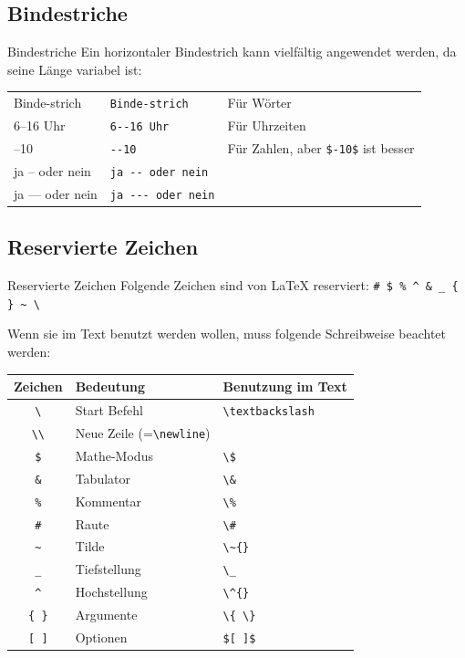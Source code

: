 \documentclass[xcolor=dvipsnames]{beamer}
\begin{document}
\subsection{Bindestriche}
\begin{frame}[fragile]{Bindestriche}
Ein horizontaler Bindestrich kann vielfältig angewendet werden, da seine Länge variabel ist: \par\medskip
{\footnotesize
\begin{tabular}{|l|l|l|}
\hline
Binde-strich & \verb|Binde-strich| & Für Wörter \\
6--16 Uhr & \verb|6--16 Uhr| & Für Uhrzeiten \\
--10 & \verb|--10| & Für Zahlen, aber \verb|$-10$| ist besser \\
ja -- oder nein & \verb|ja -- oder nein| & \\
ja --- oder nein & \verb|ja --- oder nein| & \\ \hline
\end{tabular}
}
\end{frame}


\subsection{Reservierte Zeichen} \label{sub:reserved}
\begin{frame}[fragile]{Reservierte Zeichen}
Folgende Zeichen sind von \LaTeX{} reserviert: \texttt{\# \$ \% \^{} \& \_ \{ \} \~{} \textbackslash{}} \par\medskip
Wenn sie im Text benutzt werden wollen, muss folgende Schreibweise beachtet werden: \par\medskip
{\footnotesize
\begin{tabular}{|c|l|l|}
\hline
Zeichen & Bedeutung & Benutzung im Text \\
\hline
\texttt{\textbackslash} & Start Befehl & \verb|\textbackslash| \\
\texttt{\textbackslash\textbackslash} & Neue Zeile (=\verb|\newline|) & \\
\texttt{\$} & Mathe-Modus & \verb|\$| \\
\texttt{\&} & Tabulator & \verb|\&| \\
\texttt{\%} & Kommentar & \verb|\%| \\
\texttt{\#} & Raute & \verb|\#| \\
\texttt{\~{}} & Tilde & \verb|\~{}| \\
\texttt{\_} & Tiefstellung & \verb|\_| \\
\texttt{\^{}} & Hochstellung & \verb|\^{}| \\
\texttt{\{ \}} & Argumente & \verb|\{ \}| \\
\texttt{[ ]} & Optionen & \verb|$[ ]$| \\ \hline
\end{tabular} 
}
\end{frame}
\end{document}
